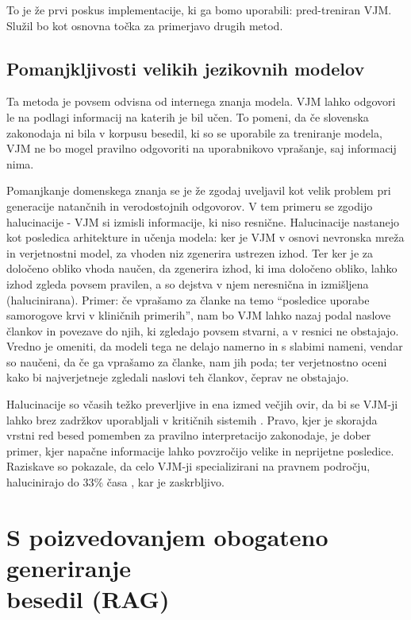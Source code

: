 \documentclass[a4paper,12pt,openright]{book}
\begin{document}
To je že prvi poskus implementacije, ki ga bomo uporabili: pred-treniran VJM. Služil bo kot osnovna točka za primerjavo drugih metod.

\subsection{Pomanjkljivosti velikih jezikovnih modelov}

Ta metoda je povsem odvisna od internega znanja modela. VJM lahko odgovori le na podlagi informacij na katerih je bil učen. To pomeni, da če slovenska zakonodaja ni bila v korpusu besedil, ki so se uporabile za treniranje modela, VJM ne bo mogel pravilno odgovoriti na uporabnikovo vprašanje, saj informacij nima.

Pomanjkanje domenskega znanja se je že zgodaj uveljavil kot velik problem pri generacije natančnih in verodostojnih odgovorov. V tem primeru se zgodijo halucinacije - VJM si izmisli informacije, ki niso resnične. Halucinacije nastanejo kot posledica arhitekture in učenja modela: ker je VJM v osnovi nevronska mreža in verjetnostni model, za vhoden niz zgenerira ustrezen izhod. Ter ker je za določeno obliko vhoda naučen, da zgenerira izhod, ki ima določeno obliko, lahko izhod zgleda povsem pravilen, a so dejstva v njem neresnična in izmišljena (halucinirana). Primer: če vprašamo za članke na temo “posledice uporabe samorogove krvi v kliničnih primerih”, nam bo VJM lahko nazaj podal naslove člankov in povezave do njih, ki zgledajo povsem stvarni, a v resnici ne obstajajo. Vredno je omeniti, da modeli tega ne delajo namerno in s slabimi nameni, vendar so naučeni, da če ga vprašamo za članke, nam jih poda; ter verjetnostno oceni kako bi najverjetneje zgledali naslovi teh člankov, čeprav ne obstajajo.

Halucinacije so včasih težko preverljive in ena izmed večjih ovir, da bi se VJM-ji lahko brez zadržkov uporabljali v kritičnih sistemih \cite{llm_hallucinations}. Pravo, kjer je skorajda vrstni red besed pomemben za pravilno interpretacijo zakonodaje, je dober primer, kjer napačne informacije lahko povzročijo velike in neprijetne posledice. Raziskave so pokazale, da celo VJM-ji specializirani na pravnem področju, halucinirajo do 33\% časa \cite{legal_rag_hallucinations}, kar je zaskrbljivo.

\section{S poizvedovanjem obogateno generiranje\\besedil (RAG)}
\end{document}
